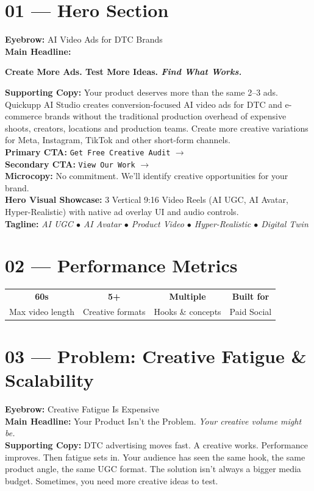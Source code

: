 \documentclass[11pt,a4paper]{article}
\begin{document}
\section{01 --- Hero Section}
\begin{tcolorbox}[colback=purple!5!white,colframe=brandpurple,title=\textbf{01 — Hero Architecture}]
\textbf{Eyebrow:} AI Video Ads for DTC Brands \\
\textbf{Main Headline:}
\begin{center}
\textbf{\Large Create More Ads. Test More Ideas. \textit{Find What Works.}}
\end{center}
\textbf{Supporting Copy:} Your product deserves more than the same 2--3 ads. Quickupp AI Studio creates conversion-focused AI video ads for DTC and e-commerce brands without the traditional production overhead of expensive shoots, creators, locations and production teams. Create more creative variations for Meta, Instagram, TikTok and other short-form channels.\\[0.5em]
\textbf{Primary CTA:} \texttt{Get Free Creative Audit} $\rightarrow$\\
\textbf{Secondary CTA:} \texttt{View Our Work} $\rightarrow$\\
\textbf{Microcopy:} No commitment. We'll identify creative opportunities for your brand.\\[0.5em]
\textbf{Hero Visual Showcase:} 3 Vertical 9:16 Video Reels (AI UGC, AI Avatar, Hyper-Realistic) with native ad overlay UI and audio controls.\\
\textbf{Tagline:} \textit{AI UGC $\bullet$ AI Avatar $\bullet$ Product Video $\bullet$ Hyper-Realistic $\bullet$ Digital Twin}
\end{tcolorbox}

\section{02 --- Performance Metrics}
\begin{table}[h!]
\centering
\begin{tabular}{cccc}
\toprule
\textbf{60s} & \textbf{5+} & \textbf{Multiple} & \textbf{Built for} \\
Max video length & Creative formats & Hooks \& concepts & Paid Social \\
\bottomrule
\end{tabular}
\end{table}

\section{03 --- Problem: Creative Fatigue \& Scalability}
\textbf{Eyebrow:} Creative Fatigue Is Expensive \\
\textbf{Main Headline:} Your Product Isn't the Problem. \textit{Your creative volume might be.}\\
\textbf{Supporting Copy:} DTC advertising moves fast. A creative works. Performance improves. Then fatigue sets in. Your audience has seen the same hook, the same product angle, the same UGC format. The solution isn't always a bigger media budget. Sometimes, you need more creative ideas to test.
\end{document}
